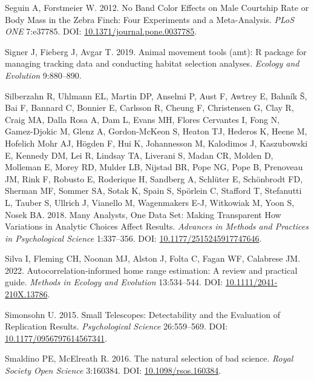 \documentclass[10pt,a4paper]{article}
\newlength{\cslhangindent}
\newlength{\cslentryspacingunit} %
\newenvironment{CSLReferences}[2] %
 {%
  \setlength{\parindent}{0pt}
  \ifodd #1
  \let\oldpar\par
  \def\par{\hangindent=\cslhangindent\oldpar}
  \fi
  \setlength{\parskip}{#2\cslentryspacingunit}
 }%
 {}
\begin{document}
\begin{CSLReferences}{1}{0}
Seguin A, Forstmeier W. 2012. No {Band} {Color} {Effects} on {Male} {Courtship} {Rate} or {Body} {Mass} in the {Zebra} {Finch}: {Four} {Experiments} and a {Meta}-{Analysis}. \emph{PLoS ONE} 7:e37785. DOI: \href{https://doi.org/10.1371/journal.pone.0037785}{10.1371/journal.pone.0037785}.

Signer J, Fieberg J, Avgar T. 2019. Animal movement tools (amt): R package for managing tracking data and conducting habitat selection analyses. \emph{Ecology and Evolution} 9:880--890.

Silberzahn R, Uhlmann EL, Martin DP, Anselmi P, Aust F, Awtrey E, Bahník Š, Bai F, Bannard C, Bonnier E, Carlsson R, Cheung F, Christensen G, Clay R, Craig MA, Dalla Rosa A, Dam L, Evans MH, Flores Cervantes I, Fong N, Gamez-Djokic M, Glenz A, Gordon-McKeon S, Heaton TJ, Hederos K, Heene M, Hofelich Mohr AJ, Högden F, Hui K, Johannesson M, Kalodimos J, Kaszubowski E, Kennedy DM, Lei R, Lindsay TA, Liverani S, Madan CR, Molden D, Molleman E, Morey RD, Mulder LB, Nijstad BR, Pope NG, Pope B, Prenoveau JM, Rink F, Robusto E, Roderique H, Sandberg A, Schlüter E, Schönbrodt FD, Sherman MF, Sommer SA, Sotak K, Spain S, Spörlein C, Stafford T, Stefanutti L, Tauber S, Ullrich J, Vianello M, Wagenmakers E-J, Witkowiak M, Yoon S, Nosek BA. 2018. Many {Analysts}, {One} {Data} {Set}: {Making} {Transparent} {How} {Variations} in {Analytic} {Choices} {Affect} {Results}. \emph{Advances in Methods and Practices in Psychological Science} 1:337--356. DOI: \href{https://doi.org/10.1177/2515245917747646}{10.1177/2515245917747646}.

Silva I, Fleming CH, Noonan MJ, Alston J, Folta C, Fagan WF, Calabrese JM. 2022. Autocorrelation‐informed home range estimation: {A} review and practical guide. \emph{Methods in Ecology and Evolution} 13:534--544. DOI: \href{https://doi.org/10.1111/2041-210X.13786}{10.1111/2041-210X.13786}.

Simonsohn U. 2015. Small {Telescopes}: {Detectability} and the {Evaluation} of {Replication} {Results}. \emph{Psychological Science} 26:559--569. DOI: \href{https://doi.org/10.1177/0956797614567341}{10.1177/0956797614567341}.

Smaldino PE, McElreath R. 2016. The natural selection of bad science. \emph{Royal Society Open Science} 3:160384. DOI: \href{https://doi.org/10.1098/rsos.160384}{10.1098/rsos.160384}.


\end{CSLReferences}
\end{document}
